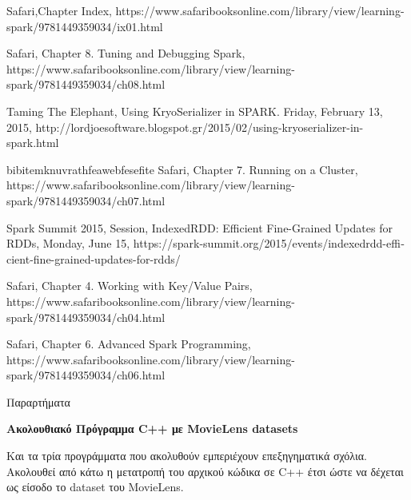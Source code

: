 \documentclass{report}
\begin{document}
{\begin{thebibliography}{9}
\textlatin{Safari,Chapter Index, https://www.safaribooksonline.com/library/view/learning-spark/9781449359034/ix01.html}

\textlatin{Safari, Chapter 8. Tuning and Debugging Spark, https://www.safaribooksonline.com/library/view/learning-spark/9781449359034/ch08.html}

\textlatin{Taming The Elephant, Using KryoSerializer in SPARK. Friday, February 13, 2015, http://lordjoesoftware.blogspot.gr/2015/02/using-kryoserializer-in-spark.html}

bibitem{knuvrathfeawebfesefite} 
\textlatin{Safari, Chapter 7. Running on a Cluster, https://www.safaribooksonline.com/library/view/learning-spark/9781449359034/ch07.html}

\textlatin{Spark Summit 2015, Session, IndexedRDD: Efficient Fine-Grained Updates for RDDs, Monday, June 15, https://spark-summit.org/2015/events/indexedrdd-efficient-fine-grained-updates-for-rdds/}

\textlatin{Safari, Chapter 4. Working with Key/Value Pairs, https://www.safaribooksonline.com/library/view/learning-spark/9781449359034/ch04.html}

\textlatin{Safari, Chapter 6. Advanced Spark Programming, https://www.safaribooksonline.com/library/view/learning-spark/9781449359034/ch06.html}






\end{thebibliography}

\newpage

\begin{center}
\LARGE{Παραρτήματα}
\end{center}

\vspace{5mm}

\textbf{\large{Ακολουθιακό Πρόγραμμα \textlatin{C++} με \textlatin{MovieLens datasets}}}

\vspace{5mm}

Και τα τρία προγράμματα που ακολυθούν εμπεριέχουν επεξηγηματικά σχόλια. 
\\
Ακολουθεί από κάτω η μετατροπή του αρχικού κώδικα σε \textlatin{C++} έτσι ώστε να δέχεται ως είσοδο το \textlatin{dataset} του \textlatin{MovieLens}.


}
\end{document}
